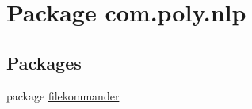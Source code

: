 \hypertarget{namespacecom_1_1poly_1_1nlp}{\section{Package com.\-poly.\-nlp}
\label{namespacecom_1_1poly_1_1nlp}
}
\subsection*{Packages}
\begin{DoxyCompactItemize}
\item 
package \hyperlink{namespacecom_1_1poly_1_1nlp_1_1filekommander}{filekommander}
\end{DoxyCompactItemize}
